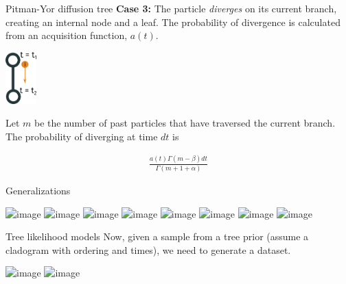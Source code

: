 \documentclass[10pt, compress]{beamer}
\begin{document}
\begin{frame}{Pitman-Yor diffusion tree}
  \textbf{Case 3:} 
  The particle \emph{diverges} on its current branch,
  creating an internal node and a leaf.
  The probability of divergence is calculated from
  an \alert{acquisition function}, $a(t)$.

  \begin{center}
      \includegraphics[width=0.09\textwidth]{img/ddt-4}
  \end{center}

  \pause

  Let $m$ be the number of past particles that have traversed the current branch.
  The probability of diverging at time $dt$ is

  \pause

  \begin{align}
    \frac{a(t)\Gamma(m - \beta)dt}{\Gamma(m + 1 + \alpha)}
  \end{align}

\end{frame}

\begin{frame}{Generalizations}
  \begin{center}
    \includegraphics<1>[width=0.8\textwidth]{img/tree-graph-0}
    \includegraphics<2>[width=0.8\textwidth]{img/tree-graph-1}
    \includegraphics<3>[width=0.8\textwidth]{img/tree-graph-2}
    \includegraphics<4>[width=0.8\textwidth]{img/tree-graph-3}
    \includegraphics<5>[width=0.8\textwidth]{img/tree-graph-4}
    \includegraphics<6>[width=0.8\textwidth]{img/tree-graph-5}
    \includegraphics<7>[width=0.8\textwidth]{img/tree-graph-6}
    \includegraphics<8>[width=0.8\textwidth]{img/tree-graph-7}
  \end{center}
\end{frame}

\begin{frame}{Tree likelihood models}
  Now, given a sample from a tree prior (assume a
  cladogram with ordering and times),
  we need to generate a dataset.

  \begin{center}
    \includegraphics<1>[width=\textwidth]{img/tree-data-0}
    \includegraphics<2>[width=\textwidth]{img/tree-data-1}
  \end{center}

\end{frame}
\end{document}
